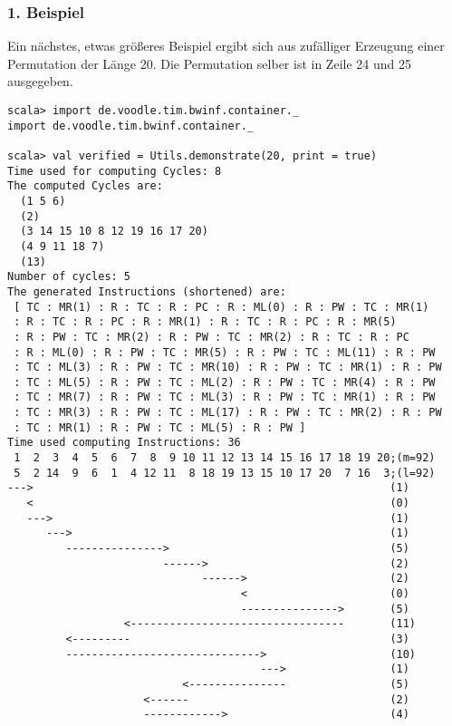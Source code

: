 \subsubsection*{1. Beispiel}
Ein nächstes, etwas größeres Beispiel ergibt sich aus zufälliger Erzeugung einer Permutation der Länge 20.
Die Permutation selber ist in Zeile 24 und 25 ausgegeben.
\lstset{basicstyle=\ttfamily}
\begin{lstlisting}
scala> import de.voodle.tim.bwinf.container._                                               
import de.voodle.tim.bwinf.container._

scala> val verified = Utils.demonstrate(20, print = true) 
Time used for computing Cycles: 8
The computed Cycles are: 
  (1 5 6)
  (2)
  (3 14 15 10 8 12 19 16 17 20)
  (4 9 11 18 7)
  (13)
Number of cycles: 5
The generated Instructions (shortened) are: 
 [ TC : MR(1) : R : TC : R : PC : R : ML(0) : R : PW : TC : MR(1)
 : R : TC : R : PC : R : MR(1) : R : TC : R : PC : R : MR(5)
 : R : PW : TC : MR(2) : R : PW : TC : MR(2) : R : TC : R : PC
 : R : ML(0) : R : PW : TC : MR(5) : R : PW : TC : ML(11) : R : PW
 : TC : ML(3) : R : PW : TC : MR(10) : R : PW : TC : MR(1) : R : PW
 : TC : ML(5) : R : PW : TC : ML(2) : R : PW : TC : MR(4) : R : PW
 : TC : MR(7) : R : PW : TC : ML(3) : R : PW : TC : MR(1) : R : PW
 : TC : MR(3) : R : PW : TC : ML(17) : R : PW : TC : MR(2) : R : PW
 : TC : MR(1) : R : PW : TC : ML(5) : R : PW ] 
Time used computing Instructions: 36
 1  2  3  4  5  6  7  8  9 10 11 12 13 14 15 16 17 18 19 20;(m=92)
 5  2 14  9  6  1  4 12 11  8 18 19 13 15 10 17 20  7 16  3;(l=92)
--->                                                       (1)
   <                                                       (0)
   --->                                                    (1)
      --->                                                 (1)
         --------------->                                  (5)
                        ------>                            (2)
                              ------>                      (2)
                                    <                      (0)
                                    --------------->       (5)
                  <---------------------------------       (11)
         <---------                                        (3)
         ------------------------------>                   (10)
                                       --->                (1)
                           <---------------                (5)
                     <------                               (2)
                     ------------>                         (4)

\end{lstlisting}
